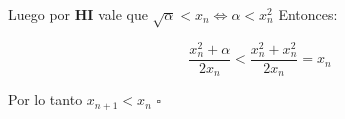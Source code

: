 Luego por {\bf HI} vale que $\sqrt{\alpha} < x_n \iff \alpha < x_n^2 $ Entonces:

\begin{displaymath}
    \frac{x_n^2 + \alpha}{2x_n} < \frac{x_n^2 + x_n^2}{2x_n} = x_n
\end{displaymath}

Por lo tanto $x_{n + 1} < x_n$ $\square$

